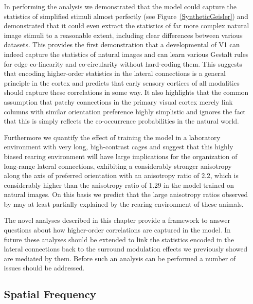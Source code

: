 In performing the analysis we demonstrated that the model could
capture the statistics of simplified stimuli almost perfectly (see
Figure~\ref{SyntheticGeisler}) and demonstrated that it could even
extract the statistics of far more complex natural image stimuli to a
reasonable extent, including clear differences between various
datasets. This provides the first demonstration that a developmental
of V1 can indeed capture the statistics of natural images and can
learn various Gestalt rules for edge co-linearity and co-circularity
without hard-coding them. This suggests that encoding higher-order
statistics in the lateral connections is a general principle in the
cortex and predicts that early sensory cortices of all modalities
should capture these correlations in some way. It also highlights that
the common assumption that patchy connections in the primary visual
cortex merely link columns with similar orientation preference highly
simplistic and ignores the fact that this is simply reflects the
co-occurrence probabilities in the natural world.

Furthermore we quantify the effect of training the model in a
laboratory environment with very long, high-contrast cages and suggest
that this highly biased rearing environment will have large
implications for the organization of long-range lateral connections,
exhibiting a considerably stronger anisotropy along the axis of
preferred orientation with an anisotropy ratio of 2.2, which is
considerably higher than the anisotropy ratio of 1.29 in the model
trained on natural images. On this basis we predict that the large
anisotropy ratios observed by \citep{Bosking1997} may at least
partially explained by the rearing environment of these animals.

The novel analyses described in this chapter provide a framework to
answer questions about how higher-order correlations are captured in
the model. In future these analyses should be extended to link the
statistics encoded in the lateral connections back to the surround
modulation effects we previously showed are mediated by them. Before
such an analysis can be performed a number of issues should be
addressed.

\subsection{Spatial Frequency}

